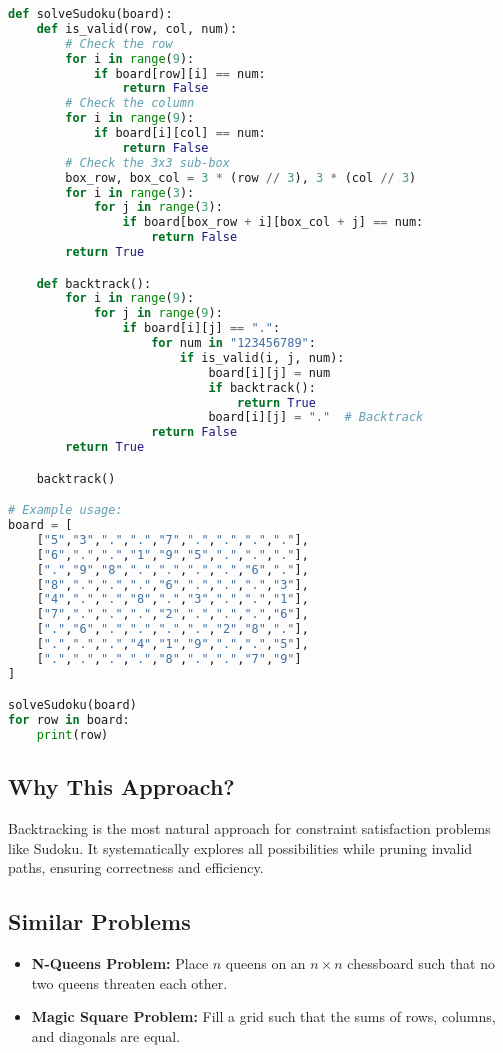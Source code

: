 \begin{fullwidth}
\begin{lstlisting}[language=Python]
def solveSudoku(board):
    def is_valid(row, col, num):
        # Check the row
        for i in range(9):
            if board[row][i] == num:
                return False
        # Check the column
        for i in range(9):
            if board[i][col] == num:
                return False
        # Check the 3x3 sub-box
        box_row, box_col = 3 * (row // 3), 3 * (col // 3)
        for i in range(3):
            for j in range(3):
                if board[box_row + i][box_col + j] == num:
                    return False
        return True

    def backtrack():
        for i in range(9):
            for j in range(9):
                if board[i][j] == ".":
                    for num in "123456789":
                        if is_valid(i, j, num):
                            board[i][j] = num
                            if backtrack():
                                return True
                            board[i][j] = "."  # Backtrack
                    return False
        return True

    backtrack()

# Example usage:
board = [
    ["5","3",".",".","7",".",".",".","."],
    ["6",".",".","1","9","5",".",".","."],
    [".","9","8",".",".",".",".","6","."],
    ["8",".",".",".","6",".",".",".","3"],
    ["4",".",".","8",".","3",".",".","1"],
    ["7",".",".",".","2",".",".",".","6"],
    [".","6",".",".",".",".","2","8","."],
    [".",".",".","4","1","9",".",".","5"],
    [".",".",".",".","8",".",".","7","9"]
]

solveSudoku(board)
for row in board:
    print(row)
\end{lstlisting}
\end{fullwidth}

\subsection*{Why This Approach?}
Backtracking is the most natural approach for constraint satisfaction problems like Sudoku. It systematically explores all possibilities while pruning invalid paths, ensuring correctness and efficiency.

\subsection*{Similar Problems}
\begin{itemize}
    \item \textbf{N-Queens Problem:} Place \(n\) queens on an \(n \times n\) chessboard such that no two queens threaten each other.
    \item \textbf{Magic Square Problem:} Fill a grid such that the sums of rows, columns, and diagonals are equal.
\end{itemize}

